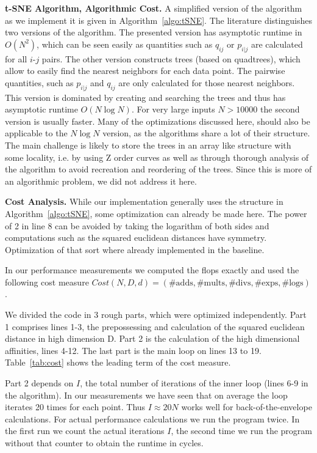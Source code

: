 \documentclass[letterpaper]{article}
\newcommand{\mypar}[1]{{\bf #1.}}
\begin{document}
\mypar{t-SNE Algorithm, Algorithmic Cost}
A simplified version of the algorithm as we implement it is given in Algorithm~\ref{algo:tSNE}. The literature distinguishes two versions of the algorithm. The presented version has asymptotic runtime in $O(N^2)$, which can be seen easily as quantities such as $q_{ij}$ or $p_{i|j}$ are calculated for all $i$-$j$ pairs. The other version constructs trees (based on quadtrees), which allow to easily find the nearest neighbors for each data point. The pairwise quantities, such as $p_{i|j}$ and $q_{ij}$ are only calculated for those nearest neighbors. This version is dominated by creating and searching the trees and thus has asymptotic runtime $O(N \log N)$. For very large inputs $N > 10000$ the second version is usually faster. Many of the optimizations discussed here, should also be applicable to the $N \log N$ version, as the algorithms share a lot of their structure. The main challenge is likely to store the trees in an array like structure with some locality, i.e. by using Z order curves \cite{stann_nearest} as well as through thorough analysis of the algorithm to avoid recreation and reordering of the trees. Since this is more of an algorithmic problem, we did not address it here.

\mypar{Cost Analysis}
While our implementation generally uses the structure in Algorithm~\ref{algo:tSNE}, some optimization can already be made here. The power of 2 in line 8 can be avoided by taking the logarithm of both sides and computations such as the squared euclidean distances have symmetry. Optimization of that sort where already implemented in the baseline.

In our performance measurements we computed the flops exactly and used the following cost measure $Cost(N, D, d) = (\# \text{adds}, \# \text{mults}, \# \text{divs}, \# \text{exps}, \# \text{logs})$.

We divided the code in 3 rough parts, which were optimized independently. Part 1 comprises lines 1-3, the prepossessing and calculation of the squared euclidean distance in high dimension D. Part 2 is the calculation of the high dimensional affinities, lines 4-12. The last part is the main loop on lines 13 to 19. Table~\ref{tab:cost} shows the leading term of the cost measure.

Part 2 depends on $I$, the total number of iterations of the inner loop (lines 6-9 in the algorithm). In our measurements we have seen that on average the loop iterates 20 times for each point. Thus $I \approx 20 N$ works well for back-of-the-envelope calculations. For actual performance calculations we run the program twice. In the first run we count the actual iterations $I$, the second time we run the program without that counter to obtain the runtime in cycles.
\end{document}
